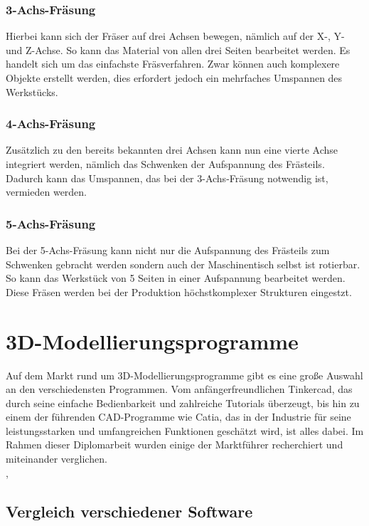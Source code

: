 \subsubsection{3-Achs-Fräsung}
Hierbei kann sich der Fräser auf drei Achsen bewegen, nämlich auf der X-, Y- und Z-Achse. So kann das Material von allen drei Seiten bearbeitet werden. Es handelt sich um das einfachste Fräsverfahren. Zwar können auch komplexere Objekte erstellt werden, dies erfordert jedoch ein mehrfaches Umspannen des Werkstücks.

\subsubsection{4-Achs-Fräsung}
Zusätzlich zu den bereits bekannten drei Achsen kann nun eine vierte Achse integriert werden, nämlich das Schwenken der Aufspannung des Frästeils. Dadurch kann das Umspannen, das bei der 3-Achs-Fräsung notwendig ist, vermieden werden.

\subsubsection{5-Achs-Fräsung}
Bei der 5-Achs-Fräsung kann nicht nur die Aufspannung des Frästeils zum Schwenken gebracht werden sondern auch der Maschinentisch selbst ist rotierbar. So kann das Werkstück von 5 Seiten in einer Aufspannung bearbeitet werden. Diese Fräsen werden bei der Produktion höchstkomplexer Strukturen eingestzt.\\
\textcite{Fraesen345Achs}


\section{3D-Modellierungsprogramme}
Auf dem Markt rund um 3D-Modellierungsprogramme gibt es eine große Auswahl an den verschiedensten Programmen. Vom anfängerfreundlichen Tinkercad, das durch seine einfache Bedienbarkeit und zahlreiche Tutorials überzeugt, bis hin zu einem der führenden CAD-Programme wie Catia, das in der Industrie für seine leistungsstarken und umfangreichen Funktionen geschätzt wird, ist alles dabei. Im Rahmen dieser Diplomarbeit wurden einige der Marktführer recherchiert und miteinander verglichen. \\
\textcite{CADProgramme}, \textcite{3DPrintingSoftware}

\subsection{Vergleich verschiedener Software}

